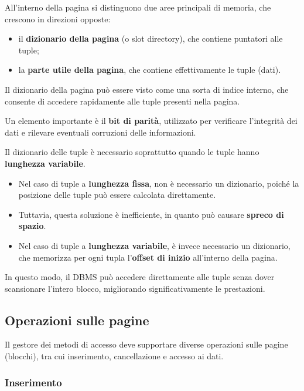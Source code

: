 All'interno della pagina si distinguono due aree principali di memoria, che crescono in direzioni opposte:

\begin{itemize}
	\item il \textbf{dizionario della pagina} (o slot directory), che contiene puntatori alle tuple;
	\item la \textbf{parte utile della pagina}, che contiene effettivamente le tuple (dati).
\end{itemize}

Il dizionario della pagina può essere visto come una sorta di indice interno, che consente di accedere rapidamente alle tuple presenti nella pagina.

Un elemento importante è il \textbf{bit di parità}, utilizzato per verificare l'integrità dei dati e rilevare eventuali corruzioni delle informazioni.

Il dizionario delle tuple è necessario soprattutto quando le tuple hanno \textbf{lunghezza variabile}.

\begin{itemize}
	\item Nel caso di tuple a \textbf{lunghezza fissa}, non è necessario un dizionario, poiché la posizione delle tuple può essere calcolata direttamente.
	
	\item Tuttavia, questa soluzione è inefficiente, in quanto può causare \textbf{spreco di spazio}.
	
	\item Nel caso di tuple a \textbf{lunghezza variabile}, è invece necessario un dizionario, che memorizza per ogni tupla l'\textbf{offset di inizio} all'interno della pagina.
\end{itemize}

In questo modo, il DBMS può accedere direttamente alle tuple senza dover scansionare l'intero blocco, migliorando significativamente le prestazioni.
\subsection{Operazioni sulle pagine}

Il gestore dei metodi di accesso deve supportare diverse operazioni sulle pagine (blocchi), tra cui inserimento, cancellazione e accesso ai dati.

\subsubsection{Inserimento}

